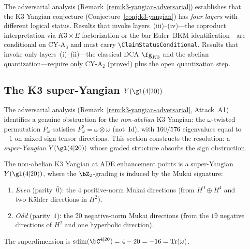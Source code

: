 \begin{warning}
\label{warn:k3-yangian-scoping}
The adversarial analysis (Remark~\ref{rem:k3-yangian-adversarial}) establishes
that the K3 Yangian conjecture (Conjecture~\ref{conj:k3-yangian}) has
\emph{four layers} with different logical status.  Results that invoke
layers~(iii)--(iv)---the coproduct interpretation via $K3 \times E$
factorization or the bar Euler--BKM identification---are conditional
on CY-A$_3$ and must carry \texttt{\textbackslash ClaimStatusConditional}.
Results that invoke only layers~(i)--(ii)---the classical DCA $\fg_{K3}$
and the abelian quantization---require only CY-A$_2$ (proved) plus
the open quantization step.
\end{warning}



\subsection{The K3 super-Yangian $Y(\gl(4|20))$}
\label{subsec:k3-super-yangian}

The adversarial analysis (Remark~\ref{rem:k3-yangian-adversarial},
Attack~A1) identifies a genuine obstruction for the
\emph{non-abelian} K3 Yangian: the $\omega$-twisted permutation
$P_\omega$ satisfies $P_\omega^2 = \omega \otimes \omega$ (not~$\mathrm{Id}$),
with $160/576$ eigenvalues equal to~$-1$ on mixed-sign tensor directions.
This section constructs the resolution: a \emph{super-Yangian}
$Y(\gl(4|20))$ whose graded structure absorbs the sign obstruction.

\begin{conjecture}
\label{conj:k3-super-yangian}
\ClaimStatusConjectured
The non-abelian K3 Yangian at ADE enhancement points is a
super-Yangian $Y(\gl(4|20))$, where the $\bZ_2$-grading is induced
by the Mukai signature:
\begin{enumerate}[label=\textup{(\roman*)}]
\item \emph{Even} (parity~$\bar 0$): the $4$ positive-norm Mukai directions
  (from $H^0 \oplus H^4$ and two K\"ahler directions in $H^2$).
\item \emph{Odd} (parity~$\bar 1$): the $20$ negative-norm Mukai directions
  (from the $19$ negative directions of $H^2$ and one hyperbolic direction).
\end{enumerate}
The superdimension is $\operatorname{sdim}(\bC^{4|20}) = 4 - 20 = -16 = \operatorname{Tr}(\omega)$.
\end{conjecture}

